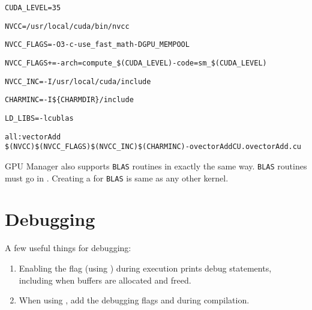 \documentclass[10pt]{report}
\begin{document}
\begin{alltt}
CUDA_LEVEL=35

NVCC = /usr/local/cuda/bin/nvcc

NVCC_FLAGS = -O3 -c -use_fast_math -DGPU_MEMPOOL

NVCC_FLAGS += -arch=compute_\$(CUDA_LEVEL) -code=sm_\$(CUDA_LEVEL)

NVCC_INC = -I/usr/local/cuda/include

CHARMINC = -I\$\{CHARMDIR\}/include

LD_LIBS= -lcublas

all: vectorAdd
\qquad\$(NVCC) \$(NVCC_FLAGS) \$(NVCC_INC) \$(CHARMINC) -o vectorAddCU.o vectorAdd.cu
\end{alltt}
GPU Manager also supports \texttt{BLAS} routines in exactly the same way. \texttt{BLAS}
routines must go in . Creating a  for \texttt{BLAS} is same as any
other kernel.


\section{Debugging}

A few useful things for debugging:

\begin{enumerate}
\item Enabling the  flag
(using ) during execution prints debug
statements, including when buffers are allocated and freed.

\item When using , add the debugging flags  and
 during compilation.
\end{enumerate}

\ifstandalone
  
\end{document}
